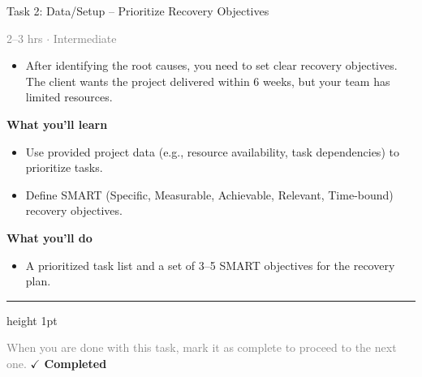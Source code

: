 \documentclass[10pt,a4paper]{article}
\begin{document}
\begin{taskbox}{Task 2: Data/Setup – Prioritize Recovery Objectives}

    {\small \textcolor{gray}{2--3 hrs $\cdot$ Intermediate}}\\[12pt]

\begin{itemize}
    \item After identifying the root causes, you need to set clear recovery objectives. The client wants the project delivered within 6 weeks, but your team has limited resources.

\end{itemize}
\vspace{8pt}
{\large \textbf{\textcolor{brandLight}{What you'll learn}}}\\[4pt] 
\begin{itemize}
    \item Use provided project data (e.g., resource availability, task dependencies) to prioritize tasks.
    \item Define SMART (Specific, Measurable, Achievable, Relevant, Time-bound) recovery objectives.

\end{itemize}
{\large \textbf{\textcolor{brandLight}{What you'll do}}}\\[4pt] 
\begin{itemize}
    \item A prioritized task list and a set of 3–5 SMART objectives for the recovery plan.\par
\end{itemize}

    \vspace{16pt}

    \textcolor{cardBorder}{\hrule height 1pt}\vspace{8pt}

    \small \textcolor{gray}{When you are done with this task, mark it as complete to proceed to the next one.} \hfill \textbf{\textcolor{brandDark}{$\checkmark$ Completed}}

\end{taskbox}
\end{document}
